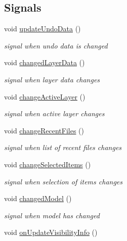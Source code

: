 \subsection*{Signals}
\begin{DoxyCompactItemize}
\item 
void \hyperlink{classShipCAD_1_1Controller_ade17d53952bf5a977dfec2e68f4fffb9}{update\-Undo\-Data} ()
\begin{DoxyCompactList}\small\item\em signal when undo data is changed \end{DoxyCompactList}\item 
void \hyperlink{classShipCAD_1_1Controller_a57eb4873ebd9c7849ed0487a75c3f40a}{changed\-Layer\-Data} ()
\begin{DoxyCompactList}\small\item\em signal when layer data changes \end{DoxyCompactList}\item 
void \hyperlink{classShipCAD_1_1Controller_aea2802b3826e7b6f7d5eae78db07f7e0}{change\-Active\-Layer} ()
\begin{DoxyCompactList}\small\item\em signal when active layer changes \end{DoxyCompactList}\item 
void \hyperlink{classShipCAD_1_1Controller_ae32527d0bde7189e5e2bf811d81bab46}{change\-Recent\-Files} ()
\begin{DoxyCompactList}\small\item\em signal when list of recent files changes \end{DoxyCompactList}\item 
void \hyperlink{classShipCAD_1_1Controller_ae28eabc4c698e3bc8732a004d2ab4034}{change\-Selected\-Items} ()
\begin{DoxyCompactList}\small\item\em signal when selection of items changes \end{DoxyCompactList}\item 
void \hyperlink{classShipCAD_1_1Controller_a3418d01b682177521f463bc6fdb7d802}{changed\-Model} ()
\begin{DoxyCompactList}\small\item\em signal when model has changed \end{DoxyCompactList}\item 
void \hyperlink{classShipCAD_1_1Controller_a73e29a9ddf9e059a5168343099b42ea0}{on\-Update\-Visibility\-Info} ()
\end{DoxyCompactItemize}
